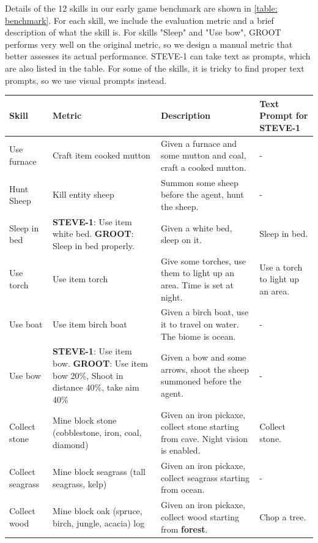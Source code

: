 Details of the 12 skills in our early game benchmark are shown in \cref{table: benchmark}. For each skill, we include the evaluation metric and a brief description of what the skill is. For skills "Sleep" and "Use bow", GROOT performs very well on the original metric, so we design a manual metric that better assesses its actual performance. STEVE-1 can take text as prompts, which are also listed in the table. For some of the skills, it is tricky to find proper text prompts, so we use visual prompts instead.  
\begin{table}[!ht]
\renewcommand{\arraystretch}{1.13}
\centering
\begin{tabularx}{0.99\linewidth}{@{}>{\centering\arraybackslash}m{1in} >{\centering\arraybackslash}m{2in} >{\centering\arraybackslash}m{2in} >{\centering\arraybackslash}m{1in}@{}}
\toprule
\textbf{Skill} & \textbf{Metric} & \textbf{Description}  & \textbf{Text Prompt for STEVE-1} \\ \midrule
Use furnace  & Craft item cooked mutton  & Given a furnace and some mutton and coal, craft a cooked mutton.  & - \\ \hline
Hunt Sheep & Kill entity sheep  & Summon some sheep before the agent, hunt the sheep.  & - \\ \hline
Sleep in bed & \textbf{STEVE-1}: Use item white bed.  \textbf{GROOT}: Sleep in bed properly. & Given a white bed, sleep on it.  & Sleep in bed. \\ \hline
Use torch & Use item torch & Give some torches, use them to light up an area. Time is set at night. & Use a torch to light up an area. \\ \hline
Use boat & Use item birch boat & Given a birch boat, use it to travel on water. The biome is ocean. & - \\ \hline
Use bow & \textbf{STEVE-1}: Use item bow.  \textbf{GROOT}: Use item bow 20\%, Shoot in distance 40\%, take aim 40\% & Given a bow and some arrows, shoot the sheep summoned before the agent. & - \\ \hline
Collect stone & Mine block stone (cobblestone, iron, coal, diamond) & Given an iron pickaxe, collect stone starting from cave. Night vision is enabled. & Collect stone. \\ \hline
Collect seagrass & Mine block seagrass (tall seagrass, kelp) & Given an iron pickaxe, collect seagrass starting from ocean. & -  \\ \hline
Collect wood & Mine block oak (spruce, birch, jungle, acacia) log & Given an iron pickaxe, collect wood starting from \textbf{forest}. & Chop a tree.    \\ \hline

\end{tabularx}
\end{table}
